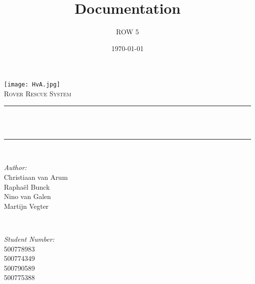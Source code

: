\title{Documentation}
\author{ROW 5}
\date{\today}

\makeatletter
\let\thetitle\@title
\let\theauthor\@author
\let\thedate\@date
\makeatother

\pagestyle{fancy}
\fancyhf{}
\rhead{\theauthor}
\lhead{\thetitle}
\cfoot{\thepage}


	\begin{titlepage}
		\centering
		\vspace*{0.5 cm}
		\texttt{[image: HvA.jpg]}\\[1.0 cm]
		\textsc{\Large Rover Rescue System}\\[0.5 cm]
		\rule{\linewidth}{0.2 mm} \\[0.4 cm]
		{ \huge \bfseries \thetitle}\\
		\rule{\linewidth}{0.2 mm} \\[1.5 cm]
		
		\begin{minipage}{0.4\textwidth}
			\begin{flushleft} \large
				\emph{Author:}\\
				Christiaan van Arum\\
				Rapha\"el Bunck\\
				Nino van Galen\\
				Martijn Vegter
			\end{flushleft}
		\end{minipage}~
		\begin{minipage}{0.4\textwidth}
			\begin{flushright} \large
				\emph{Student Number:} \\
				500778983\\ %
				500774349\\ %
				500790589\\ %
				500775388	%
			\end{flushright}
		\end{minipage}\\[2 cm]
		
		{\large \thedate}\\[2 cm]
		
		\vfill
		
	\end{titlepage}
